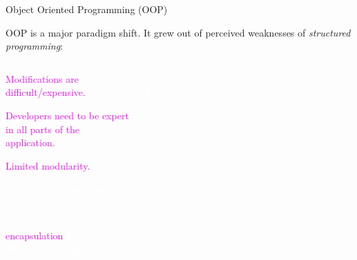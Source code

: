 \documentclass[11pt]{beamer}
\newcommand{\bi}{\begin{itemize}}
\newcommand{\ei}{\end{itemize}}
\begin{document}
\begin{frame}{Object Oriented Programming (OOP)}

OOP is a major paradigm shift. It grew out of perceived weaknesses of \emph{structured programming}:
\begin{columns}[onlytextwidth,t]
  \begin{column}{0.48\textwidth}
  \bi
  \item \textcolor{magenta}{Modifications are difficult/expensive.
  \item Developers need to be expert in all parts of the application.
  \item Limited modularity.}
  \item [\textcolor{white}{\textbullet}] \textcolor{white}{Centralized development constraint.}

  \ei
  \end{column}
  \begin{column}{0.48\textwidth}
  \bi
  \item [\textcolor{white}{\textbullet}] \textcolor{white}{Multiple implementations of the same functionality.}

  \item [\textcolor{white}{\textbullet}] \textcolor{white}{Need to support several data structures that are nearly identical but vary in some systematic ways.
\item [\textcolor{white}{\textbullet}] Difficult to maintain consistency as such structures are extended.}

  \ei

  \end{column}
\end{columns}

  \vfill
  \scriptsize{
\quad \quad \quad \textcolor{magenta}{encapsulation}
\quad \quad \quad \quad \quad \quad 
\quad \quad \quad \quad \quad \quad \quad \textcolor{white}{polymorphism}\\
\quad \quad \quad \textcolor{white}{inheritance}
\quad \quad \quad \quad \quad \quad 
\quad \quad \quad \quad \quad \quad \quad \quad \textcolor{white}{templates}
}

\end{frame}
\end{document}
